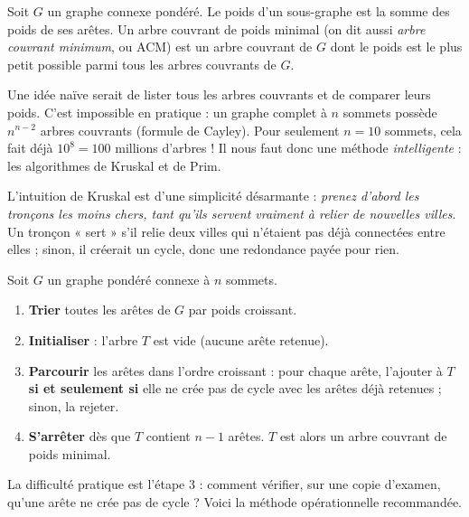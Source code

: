 \documentclass[11pt]{article}
\newcommand{\cle}[1]{{\popxbold\color{popdark}#1}}
\newcounter{popsec}
\newcounter{popsub}
\newcommand{\courssub}[1]{%
  \stepcounter{popsub}%
  \par\vspace{9pt}\noindent{\popxbold\fontsize{11.5}{13}\selectfont\color{popink}{\color{poporange}\thepopsec.\thepopsub}\hspace{6pt}#1}\par\nopagebreak\vspace{4pt}
}
\begin{document}
\begin{definition}
Soit $G$ un graphe connexe \cle{pondéré}. Le \cle{poids} d'un sous-graphe est la somme des poids de ses arêtes. Un \cle{arbre couvrant de poids minimal} (on dit aussi \emph{arbre couvrant minimum}, ou ACM) est un arbre couvrant de $G$ dont le poids est le plus petit possible parmi tous les arbres couvrants de $G$.
\end{definition}

\begin{attention}
Une idée naïve serait de lister tous les arbres couvrants et de comparer leurs poids. C'est impossible en pratique : un graphe complet à $n$ sommets possède $n^{n-2}$ arbres couvrants (formule de Cayley). Pour seulement $n = 10$ sommets, cela fait déjà $10^{8} = 100$ millions d'arbres ! Il nous faut donc une méthode \emph{intelligente} : les algorithmes de Kruskal et de Prim.
\end{attention}

\courssub{L'algorithme de Kruskal}

L'intuition de Kruskal est d'une simplicité désarmante : \emph{prenez d'abord les tronçons les moins chers, tant qu'ils servent vraiment à relier de nouvelles villes}. Un tronçon « sert » s'il relie deux villes qui n'étaient pas déjà connectées entre elles ; sinon, il créerait un cycle, donc une redondance payée pour rien.

\begin{methode}
Soit $G$ un graphe pondéré connexe à $n$ sommets.
\begin{enumerate}
\item \textbf{Trier} toutes les arêtes de $G$ par poids \cle{croissant}.
\item \textbf{Initialiser} : l'arbre $T$ est vide (aucune arête retenue).
\item \textbf{Parcourir} les arêtes dans l'ordre croissant : pour chaque arête, l'ajouter à $T$ \textbf{si et seulement si} elle ne crée pas de cycle avec les arêtes déjà retenues ; sinon, la rejeter.
\item \textbf{S'arrêter} dès que $T$ contient $n-1$ arêtes. $T$ est alors un arbre couvrant de poids minimal.
\end{enumerate}
\end{methode}

La difficulté pratique est l'étape 3 : comment vérifier, sur une copie d'examen, qu'une arête ne crée pas de cycle ? Voici la méthode opérationnelle recommandée.
\end{document}
